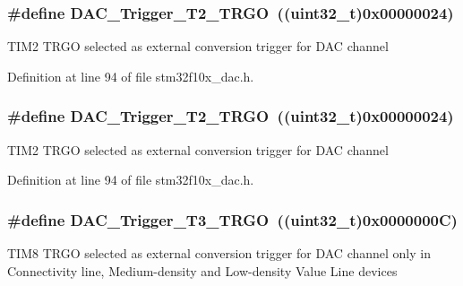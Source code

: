 \subsubsection[{\texorpdfstring{D\+A\+C\+\_\+\+Trigger\+\_\+\+T2\+\_\+\+T\+R\+GO}{DAC_Trigger_T2_TRGO}}]{\setlength{\rightskip}{0pt plus 5cm}\#define D\+A\+C\+\_\+\+Trigger\+\_\+\+T2\+\_\+\+T\+R\+GO~(({\bf uint32\+\_\+t})0x00000024)}\hypertarget{group___d_a_c__trigger__selection_ga3bfbff1e03af1fd17a57a43e57420fe6}{}\label{group___d_a_c__trigger__selection_ga3bfbff1e03af1fd17a57a43e57420fe6}
T\+I\+M2 T\+R\+GO selected as external conversion trigger for D\+AC channel 

Definition at line 94 of file stm32f10x\+\_\+dac.\+h.

\subsubsection[{\texorpdfstring{D\+A\+C\+\_\+\+Trigger\+\_\+\+T2\+\_\+\+T\+R\+GO}{DAC_Trigger_T2_TRGO}}]{\setlength{\rightskip}{0pt plus 5cm}\#define D\+A\+C\+\_\+\+Trigger\+\_\+\+T2\+\_\+\+T\+R\+GO~(({\bf uint32\+\_\+t})0x00000024)}\hypertarget{group___d_a_c__trigger__selection_ga3bfbff1e03af1fd17a57a43e57420fe6}{}\label{group___d_a_c__trigger__selection_ga3bfbff1e03af1fd17a57a43e57420fe6}
T\+I\+M2 T\+R\+GO selected as external conversion trigger for D\+AC channel 

Definition at line 94 of file stm32f10x\+\_\+dac.\+h.

\subsubsection[{\texorpdfstring{D\+A\+C\+\_\+\+Trigger\+\_\+\+T3\+\_\+\+T\+R\+GO}{DAC_Trigger_T3_TRGO}}]{\setlength{\rightskip}{0pt plus 5cm}\#define D\+A\+C\+\_\+\+Trigger\+\_\+\+T3\+\_\+\+T\+R\+GO~(({\bf uint32\+\_\+t})0x0000000\+C)}\hypertarget{group___d_a_c__trigger__selection_ga82cbaedc35164c8b9fe0be2faec9b909}{}\label{group___d_a_c__trigger__selection_ga82cbaedc35164c8b9fe0be2faec9b909}
T\+I\+M8 T\+R\+GO selected as external conversion trigger for D\+AC channel only in Connectivity line, Medium-\/density and Low-\/density Value Line devices 

